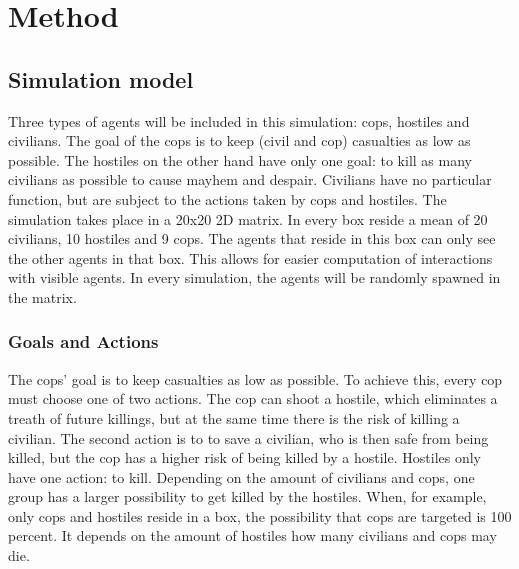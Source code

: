 \section{Method}
\subsection{Simulation model}
Three types of agents will be included in this simulation: cops, hostiles and civilians. The goal of the cops is to keep (civil and cop) casualties as low as possible. The hostiles on the other hand have only one goal: to kill as many civilians as possible to cause mayhem and despair. Civilians have no particular function, but are subject to the actions taken by cops and hostiles. The simulation takes place in a 20x20 2D matrix. In every box reside a mean of 20 civilians, 10 hostiles and 9 cops. The agents that reside in this box can only see the other agents in that box. This allows for easier computation of interactions with visible agents. In every simulation, the agents will be randomly spawned in the matrix.  

\subsubsection{Goals and Actions}
The cops' goal is to keep casualties as low as possible. To achieve this, every cop must choose one of two actions. The cop can shoot a hostile, which eliminates a treath of future killings, but at the same time there is the risk of killing a civilian. The second action is to to save a civilian, who is then safe from being killed, but the cop has a higher risk of being killed by a hostile. Hostiles only have one action: to kill. Depending on the amount of civilians and cops, one group has a larger possibility to get killed by the hostiles. When, for example, only cops and hostiles reside in a box, the possibility that cops are targeted is 100 percent. It depends on the amount of hostiles how many civilians and cops may die.

